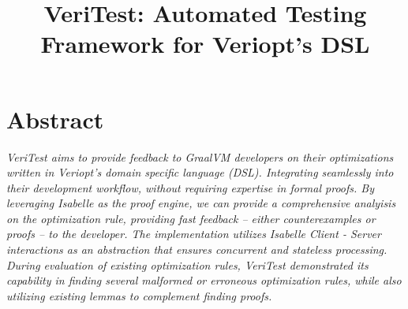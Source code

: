 \documentclass[conference,a4paper,english,10pt]{IEEEtran}[2015/08/26]
\begin{document}

\title{\Large \textbf{VeriTest: Automated Testing Framework for Veriopt's DSL}}

\begin{large}
\author{%
}
\end{large}


\maketitle

%
%
\iffalse
  \IEEEoverridecommandlockouts
  \IEEEpubid{\begin{minipage}{\textwidth}\ \\[12pt] \centering
      1551-3203 \copyright 2015 IEEE.
      Personal use is permitted, but republication/redistribution requires IEEE permission.
      \\
      See \url{https://www.ieee.org/publications_standards/publications/rights/index.html} for more information.
    \end{minipage}}
\fi

\section*{\centering \textbf{Abstract}}
\begin{sublargesize}
  \textit{
    VeriTest aims to provide feedback to GraalVM developers on their optimizations written in Veriopt's domain specific language (DSL). 
    Integrating seamlessly into their development workflow, without requiring expertise in formal proofs. By leveraging Isabelle as the proof engine, 
    we can provide a comprehensive analyisis on the optimization rule, providing fast feedback -- either counterexamples or proofs -- to the developer. 
    The implementation utilizes Isabelle Client - Server interactions as an abstraction that ensures concurrent and stateless processing.
    During evaluation of existing optimization rules, VeriTest demonstrated its capability in finding several malformed or erroneous optimization 
    rules, while also utilizing existing lemmas to complement finding proofs.
  }
\end{sublargesize}
\end{document}

